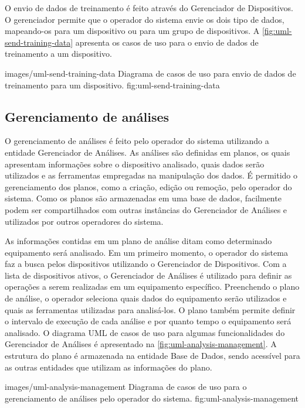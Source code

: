 O envio de dados de treinamento é feito através do Gerenciador de Dispositivos. O gerenciador
permite que o operador do sistema envie os dois tipo de dados, mapeando-os para um dispositivo ou
para um grupo de dispositivos. A \cref{fig:uml-send-training-data} apresenta os casos de uso para o
envio de dados de treinamento a um dispositivo.

  {images/uml-send-training-data}
  {Diagrama de casos de uso para envio de dados de treinamento para um dispositivo.}
  {fig:uml-send-training-data}


\subsection{Gerenciamento de análises}

O gerenciamento de análises é feito pelo operador do sistema utilizando a entidade Gerenciador de
Análises. As análises são definidas em planos, os quais apresentam informações sobre o dispositivo
analisado, quais dados serão utilizados e as ferramentas empregadas na manipulação dos dados. É
permitido o gerenciamento dos planos, como a criação, edição ou remoção, pelo operador do sistema.
Como os planos são armazenadas em uma base de dados, facilmente podem ser compartilhados com outras
instâncias do Gerenciador de Análises e utilizados por outros operadores do sistema.

As informações contidas em um plano de análise ditam como determinado equipamento será analisado. Em
um primeiro momento, o operador do sistema faz a busca pelos dispositivos utilizando o Gerenciador
de Dispositivos. Com a lista de dispositivos ativos, o Gerenciador de Análises é utilizado para
definir as operações a serem realizadas em um equipamento específico. Preenchendo o plano de
análise, o operador seleciona quais dados do equipamento serão utilizados e quais as ferramentas
utilizadas para analisá-los. O plano também permite definir o intervalo de execução de cada análise
e por quanto tempo o equipamento será analisado. O diagrama \gls{UML} de casos de uso para algumas
funcionalidades do Gerenciador de Análises é apresentado na \cref{fig:uml-analysis-management}. A
estrutura do plano é armazenada na entidade Base de Dados, sendo acessível para as outras entidades
que utilizam as informações do plano.

  {images/uml-analysis-management}
  {Diagrama de casos de uso para o gerenciamento de análises pelo operador do sistema.}
  {fig:uml-analysis-management}

